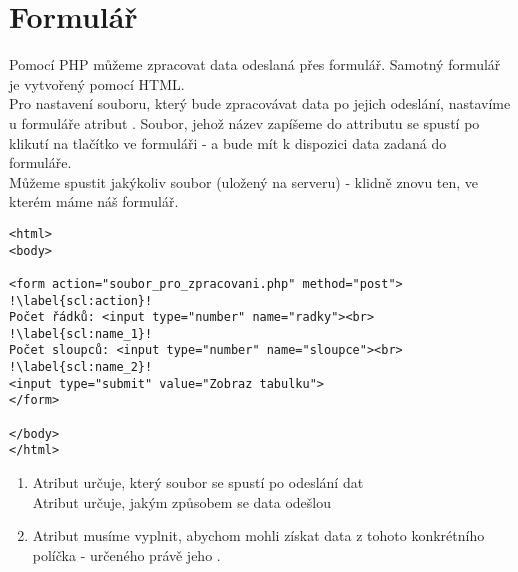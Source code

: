 \section{Formulář}
Pomocí PHP můžeme zpracovat data odeslaná přes formulář. Samotný formulář je vytvořený pomocí HTML.\\
Pro nastavení souboru, který bude zpracovávat data po jejich odeslání, nastavíme u formuláře atribut . Soubor, jehož název zapíšeme do attributu  se spustí po klikutí na tlačítko ve formuláři - a bude mít k dispozici data zadaná do formuláře.\\
Můžeme spustit jakýkoliv soubor (uložený na serveru) - klidně znovu ten, ve kterém máme náš formulář. \\

\begin{minipage}[t]{.45\textwidth}
\begin{code}
\begin{verbatim}
<html>
<body>

<form action="soubor_pro_zpracovani.php" method="post"> !\label{scl:action}!
Počet řádků: <input type="number" name="radky"><br>	!\label{scl:name_1}!
Počet sloupců: <input type="number" name="sloupce"><br> !\label{scl:name_2}!
<input type="submit" value="Zobraz tabulku">
</form>

</body>
</html> 
\end{verbatim}

\label{code:php_form_html}
\end{code}
\end{minipage}
\begin{minipage}[t]{.45\textwidth}
\vspace{2.7cm}
\begin{enumerate}
\item[ř. \ref{scl:action}:] Atribut  určuje, který soubor se spustí po odeslání dat\\
Atribut  určuje, jakým způsobem se data odešlou
\item[ř. \ref{scl:name_1},\ref{scl:name_2}] Atribut  musíme vyplnit, abychom mohli získat data z tohoto konkrétního políčka - určeného právě jeho .
\end{enumerate}
\end{minipage}

